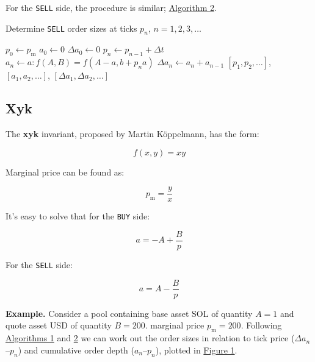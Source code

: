 \documentclass{article}
\begin{document}
For the \texttt{SELL} side, the procedure is similar; \hyperref[alg:2]{Algorithm 2}.

\begin{algorithm}
  \caption{Determine \texttt{SELL} order sizes at ticks $p_n$, $n = 1, 2, 3, \dots$}
  \label{alg:2}
  \begin{algorithmic}
    \State $p_0 \gets p_{\mathrm{m}}$
    \State $a_0 \gets 0$
    \State $\Delta a_0 \gets 0$
    \State $p_n \gets p_{n-1} + \Delta t$
    \State $a_n \gets a: f(A, B) = f(A - a, b + p_n a)$ 
    \State $\Delta a_n \gets a_n + a_{n-1}$
    \EndFor
    \State \Return $[p_1, p_2, \dots]$, $[a_1, a_2, \dots]$, $[\Delta a_1, \Delta a_2, \dots]$
  \end{algorithmic}
\end{algorithm}

\subsection{Xyk}

The \textbf{xyk} invariant, proposed by Martin Köppelmann,\supercite{xykamm} has the form:

\begin{equation}
  f(x, y) = xy
\end{equation}

Marginal price can be found as:

\begin{equation}
  p_{\mathrm{m}} = \frac{y}{x}
\end{equation}

It's easy to solve that for the \texttt{BUY} side:

\begin{equation}
  a = -A + \frac{B}{p}
\end{equation}

For the \texttt{SELL} side:

\begin{equation}
  a = A - \frac{B}{p}
\end{equation}

\textbf{Example.} Consider a pool containing base asset SOL of quantity $A = 1$ and quote asset USD of quantity $B = 200$. marginal price $p_{\mathrm{m}} = 200$. Following \hyperref[alg:1]{Algorithms 1} and \hyperref[alg:2]{2} we can work out the order sizes in relation to tick price ($\Delta a_n$--$p_n$) and cumulative order depth ($a_n$--$p_n$), plotted in \hyperref[fig:1]{Figure 1}.
\end{document}
